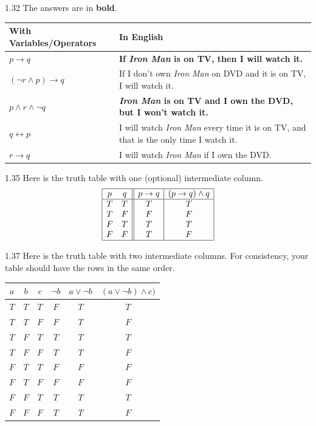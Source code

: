 \begin{Answer}{1.32}
The answers are in {\bf bold}.\\
\begin{tabular}[t]{|l|p{}|}
\hline
With Variables/Operators&In English\\
\hline
\hline
$p\rightarrow q$&{\bf If {\em Iron Man} is on TV, then I will watch it.}\\
\hline
\boldmath$(\neg r\wedge p)\rightarrow q$&If I don't own {\em Iron Man} on DVD and it is on TV, I will watch it.\\
\hline
$p\wedge r \wedge\neg q$&{\bf {\em Iron Man} is on TV and I own the DVD, but I won't watch it.}\\
\hline
\boldmath$q\leftrightarrow p$&I will watch {\em Iron Man} every time it is on TV, and that is the only time I watch it.\\
\hline
\boldmath$r\rightarrow q$&I will watch {\em Iron Man} if I own the DVD.\\
\hline
\end{tabular}
\end{Answer}
\begin{Answer}{1.35}
Here is the truth table with one (optional) intermediate column.
$$ \begin{array}{|cc||c|c|} \hline p & q & p  \rightarrow q & (p \rightarrow q) \wedge q \\
\hline
T & T & T & T\\
T & F & F & F \\
F & T & T & T \\
F & F & T & F \\
\hline
\end{array}$$
\end{Answer}
\begin{Answer}{1.37}
Here is the truth table with two intermediate columns.
For consistency, your table should have the rows in the same order.\\
\begin{tabular}[t]{|ccc||c|c|c|}
\hline $a$ & $b$ & $c$ & $\neg b$ & $a\vee \neg b$ & $(a \vee\neg b)\wedge c)$ \\
\hline
$T$ & $T$ & $T$ & $F $ & $T $ & $T $ \\
$T$ & $T$ & $F$ & $F $ & $T $ & $F $ \\
$T$ & $F$ & $T$ & $T $ & $T $ & $T $ \\
$T$ & $F$ & $F$ & $T $ & $T $ & $F $ \\
$F$ & $T$ & $T$ & $F $ & $F $ & $F $ \\
$F$ & $T$ & $F$ & $F $ & $F $ & $F $ \\
$F$ & $F$ & $T$ & $T $ & $T $ & $T $ \\
$F$ & $F$ & $F$ & $T $ & $T $ & $F $ \\
\hline
\end{tabular}
\end{Answer}
